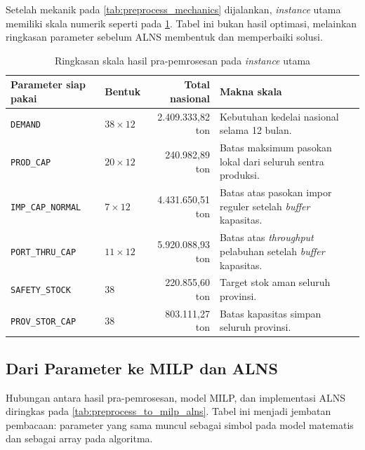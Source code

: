 \documentclass{file/TA-ITS}
\theoremstyle{definition}
\theoremstyle{definition}
\theoremstyle{plain}
\begin{document}
Setelah mekanik pada \ref{tab:preprocess_mechanics} dijalankan, \textit{instance} utama memiliki skala numerik seperti pada \ref{tab:preprocessing_snapshot}. Tabel ini bukan hasil optimasi, melainkan ringkasan parameter sebelum ALNS membentuk dan memperbaiki solusi.

\begin{table}[H]
\centering
\caption{Ringkasan skala hasil pra-pemrosesan pada \textit{instance} utama}
\label{tab:preprocessing_snapshot}
\scriptsize
\begin{tabularx}{\textwidth}{@{}p{}p{}rX@{}}
\toprule
\textbf{Parameter siap pakai} & \textbf{Bentuk} & \textbf{Total nasional} & \textbf{Makna skala} \\
\midrule
\texttt{DEMAND} & $38 \times 12$ & 2.409.333,82 ton & Kebutuhan kedelai nasional selama 12 bulan. \\
\texttt{PROD\_CAP} & $20 \times 12$ & 240.982,89 ton & Batas maksimum pasokan lokal dari seluruh sentra produksi. \\
\texttt{IMP\_CAP\_NORMAL} & $7 \times 12$ & 4.431.650,51 ton & Batas atas pasokan impor reguler setelah \textit{buffer} kapasitas. \\
\texttt{PORT\_THRU\_CAP} & $11 \times 12$ & 5.920.088,93 ton & Batas atas \textit{throughput} pelabuhan setelah \textit{buffer} kapasitas. \\
\texttt{SAFETY\_STOCK} & $38$ & 220.855,60 ton & Target stok aman seluruh provinsi. \\
\texttt{PROV\_STOR\_CAP} & $38$ & 803.111,27 ton & Batas kapasitas simpan seluruh provinsi. \\
\bottomrule
\end{tabularx}
\end{table}

\subsection{Dari Parameter ke MILP dan ALNS}

Hubungan antara hasil pra-pemrosesan, model MILP, dan implementasi ALNS diringkas pada \ref{tab:preprocess_to_milp_alns}. Tabel ini menjadi jembatan pembacaan: parameter yang sama muncul sebagai simbol pada model matematis dan sebagai array pada algoritma.
\end{document}

